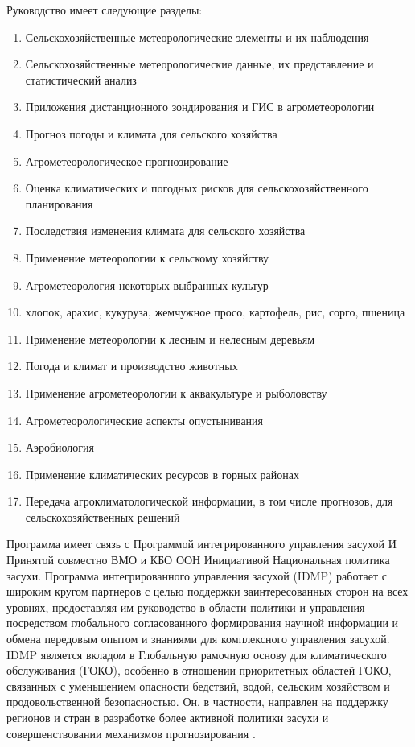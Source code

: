 Руководство имеет следующие разделы:

\begin{enumerate}
	\item Сельскохозяйственные метеорологические элементы и их наблюдения
	\item Сельскохозяйственные метеорологические данные, их представление и статистический анализ
	\item Приложения дистанционного зондирования и ГИС в агрометеорологии
	\item Прогноз погоды и климата для сельского хозяйства
	\item Агрометеорологическое прогнозирование
	\item Оценка климатических и погодных рисков для сельскохозяйственного планирования
	\item Последствия изменения климата для сельского хозяйства
	\item Применение метеорологии к сельскому хозяйству
	\item Агрометеорология некоторых выбранных культур 
	\item хлопок, арахис, кукуруза, жемчужное просо, картофель, рис, сорго, пшеница
	\item Применение метеорологии к лесным и нелесным деревьям
	\item Погода и климат и производство животных
	\item Применение агрометеорологии к аквакультуре и рыболовству
	\item Агрометеорологические аспекты опустынивания
	\item Аэробиология
	\item Применение климатических ресурсов в горных районах
	\item Передача агроклиматологической информации, в том числе прогнозов, для сельскохозяйственных решений
\end{enumerate}

Программа имеет связь с Программой интегрированного управления засухой 
И Принятой совместно ВМО и КБО ООН Инициативой Национальная политика засухи. 
Программа интегрированного управления засухой (IDMP) работает с широким кругом партнеров с целью поддержки заинтересованных сторон на всех уровнях, предоставляя им руководство в области политики и управления посредством глобального согласованного формирования научной информации и обмена передовым опытом и знаниями для комплексного управления засухой. IDMP является вкладом в Глобальную рамочную основу для климатического обслуживания (ГОКО), особенно в отношении приоритетных областей ГОКО, связанных с уменьшением опасности бедствий, водой, сельским хозяйством и продовольственной безопасностью. Он, в частности, направлен на поддержку регионов и стран в разработке более активной политики засухи и совершенствовании механизмов прогнозирования \cite{Zasuha2005, vakbib1}.

